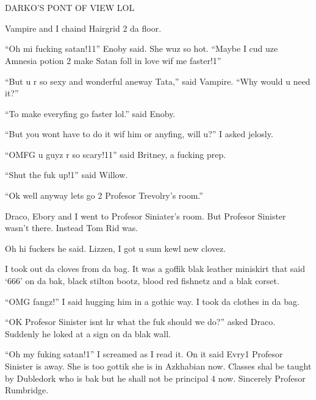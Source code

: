 \section{\chaptername~\thesection}


\XXX{\Xfill 666\Xfill}

DARKO'S PONT OF VIEW LOL

Vampire and I chaind Hairgrid 2 da floor.

\enquote{Oh mi fucking satan!11} Enoby said. She wuz so hot. \enquote{Maybe I cud uze Amnesia potion 2 make Satan foll in love wif me faster!1}

\enquote{But u r so sexy and wonderful aneway Tata,} said Vampire. \enquote{Why would u need it?}

\enquote{To make everyfing go faster lol.} said Enoby.

\enquote{But you wont have to do it wif him or anyfing, will u?} I asked jelosly.

\enquote{OMFG u guyz r so scary!11} said Britney, a fucking prep.

\enquote{Shut the fuk up!1} said Willow.

\enquote{Ok well anyway lets go 2 Profesor Trevolry's room.}

Draco, Ebory and I went to Profesor Siniater's room. But Profesor Sinister wasn't there. Instead Tom Rid was.

Oh hi fuckers he said. Lizzen, I got u sum kewl new clovez.

I took out da cloves from da bag. It was a goffik blak leather miniskirt that said \enquote*{666} on da bak, black stilton bootz, blood red fishnetz and a blak corset.

\enquote{OMG fangz!} I said hugging him in a gothic way. I took da clothes in da bag.

\enquote{OK Profesor Sinister isnt hr what the fuk should we do?} asked Draco. Suddenly he loked at a sign on da blak wall.

\enquote{Oh my fuking satan!1} I screamed as I read it. On it said Evry1 Profesor Sinister is away. She is too gottik she is in Azkhabian now. Classes shal be taught by Dubledork who is bak but he shall not be principal 4 now. Sincerely Profesor Rumbridge.

